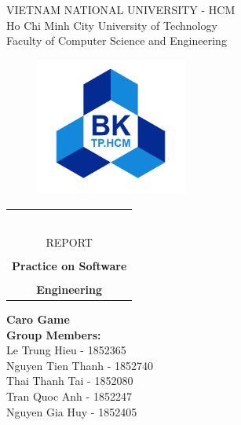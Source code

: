 \documentclass[a4paper]{article}
\begin{document}
\begin{titlepage}
\begin{center}
VIETNAM NATIONAL UNIVERSITY - HCM \\
Ho Chi Minh City University of Technology \\
Faculty of Computer Science and Engineering 
\end{center}

\vspace{0.5cm}

\begin{figure}[h!]
\begin{center}
\includegraphics[width=5cm]{hcmut.png}
\end{center}
\end{figure}

\vspace{0.5cm}


\begin{center}
\begin{tabular}{c}

~~\\

\\
{\huge {REPORT}}\\
\\
\textbf{\Huge{Practice on Software}}\\
\\
\textbf{\Huge{Engineering}}\\
\end{tabular}
\end{center}

\vspace{0.5cm}
\begin{center}
    \textbf{\Huge{Caro Game}}\\
    \vspace{0.5cm}
    \textbf{Group Members:}\\
    Le Trung Hieu - 1852365\\
    Nguyen Tien Thanh - 1852740\\
    Thai Thanh Tai  - 1852080\\
    Tran Quoc Anh  - 1852247\\
    Nguyen Gia Huy - 1852405\\
\end{center}


\end{titlepage}
\end{document}
